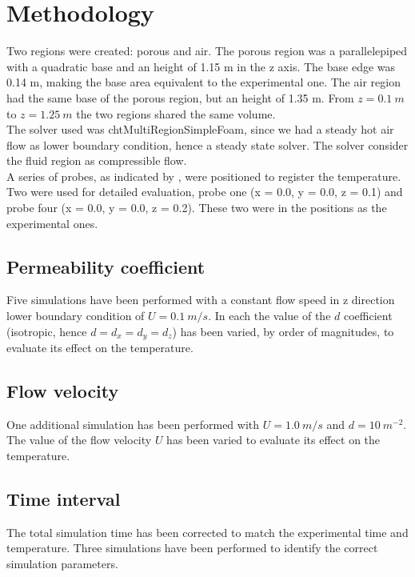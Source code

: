 
\section{Methodology}
\label{section:methodology}

Two regions were created: porous and air.
The porous region was a parallelepiped with a quadratic base and an height of
1.15 m in the z axis. The base edge was 0.14 m, making the base area
equivalent to the experimental one.
The air region had the same base of the porous region, but an height of
1.35 m.
From $z=0.1 ~m$ to $z=1.25 ~m$ the two regions shared the same volume.\\
The solver used was chtMultiRegionSimpleFoam, since we had a steady hot
air flow as lower boundary condition, hence a steady state solver.
The solver consider the fluid region as compressible flow.\\
A series of probes, as indicated by \textcite{RegionProbe}, were positioned to
register the temperature.
Two were used for detailed evaluation, probe one (x = 0.0, y = 0.0, z = 0.1) and
probe four (x = 0.0, y = 0.0, z = 0.2). These two were in the positions as the
experimental ones.

\subsection{Permeability coefficient}
\label{subsection:permeabilitycoefficient}

Five simulations have been performed with a constant flow speed in z
direction lower boundary condition of $U = 0.1 ~m/s$.
In each the value of the $d$ coefficient (isotropic, hence $d = d_x = d_y =
d_z$) has been varied, by order of magnitudes, to evaluate its effect on the temperature.

\subsection{Flow velocity}
\label{subsection:flowvelocity}

One additional simulation has been performed with $U = 1.0 ~m/s$ and
$d = 10 ~m^{-2}$.
The value of the flow velocity $U$ has been varied to
evaluate its effect on the temperature.

\subsection{Time interval}
\label{subsection:timeinterval}

The total simulation time has been corrected to match the experimental time and
temperature.
Three simulations have been performed to identify the correct simulation
parameters.

